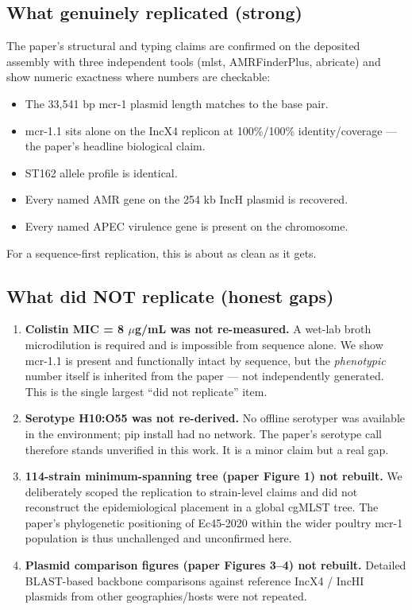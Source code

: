 \documentclass[11pt,letterpaper]{article}
\begin{document}
\subsection*{What genuinely replicated (strong)}
The paper's structural and typing claims are confirmed on the deposited
assembly with three independent tools (mlst, AMRFinderPlus, abricate) and
show numeric exactness where numbers are checkable:
\begin{itemize}[leftmargin=1.5em]
  \item The 33{,}541 bp mcr-1 plasmid length matches to the base pair.
  \item mcr-1.1 sits alone on the IncX4 replicon at 100\%/100\% identity/coverage --- the paper's headline biological claim.
  \item ST162 allele profile is identical.
  \item Every named AMR gene on the 254 kb IncH plasmid is recovered.
  \item Every named APEC virulence gene is present on the chromosome.
\end{itemize}
For a sequence-first replication, this is about as clean as it gets.

\subsection*{What did NOT replicate (honest gaps)}
\begin{enumerate}[leftmargin=1.5em]
  \item \textbf{Colistin MIC = 8 $\mu$g/mL was not re-measured.} A wet-lab broth
        microdilution is required and is impossible from sequence alone. We
        show mcr-1.1 is present and functionally intact by sequence, but the
        \emph{phenotypic} number itself is inherited from the paper --- not
        independently generated. This is the single largest ``did not
        replicate'' item.
  \item \textbf{Serotype H10:O55 was not re-derived.} No offline serotyper was
        available in the environment; pip install had no network. The paper's
        serotype call therefore stands unverified in this work. It is a minor
        claim but a real gap.
  \item \textbf{114-strain minimum-spanning tree (paper Figure 1) not rebuilt.}
        We deliberately scoped the replication to strain-level claims and did
        not reconstruct the epidemiological placement in a global cgMLST tree.
        The paper's phylogenetic positioning of Ec45-2020 within the wider
        poultry mcr-1 population is thus unchallenged and unconfirmed here.
  \item \textbf{Plasmid comparison figures (paper Figures 3--4) not rebuilt.}
        Detailed BLAST-based backbone comparisons against reference IncX4 /
        IncHI plasmids from other geographies/hosts were not repeated.
\end{enumerate}
\end{document}
